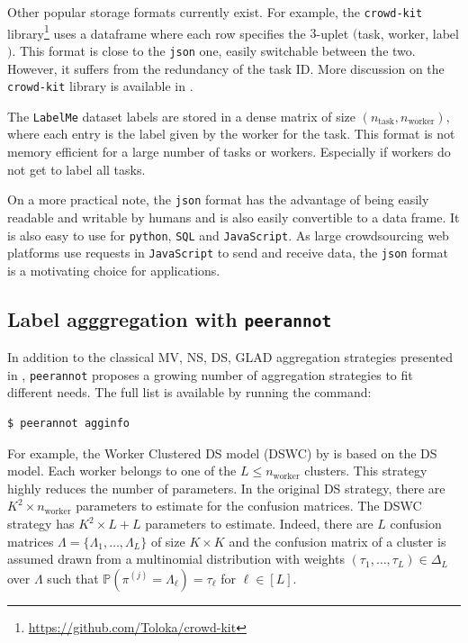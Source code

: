 Other popular storage formats currently exist.
For example, the \texttt{crowd-kit} library\footnote{\url{https://github.com/Toloka/crowd-kit}} uses a dataframe where each row specifies the $3$-uplet $($task, worker, label$)$.
This format is close to the \texttt{json} one, easily switchable between the two. However, it suffers from the redundancy of the task ID.
More discussion on the \texttt{crowd-kit} library is available in .

The \texttt{LabelMe} dataset labels are stored in a dense matrix of size $(n_{\text{task}}, n_{\text{worker}})$, where each entry is the label given by the worker for the task. This format is not memory efficient for a large number of tasks or workers. Especially if workers do not get to label all tasks.

On a more practical note, the \texttt{json} format has the advantage of being easily readable and writable by humans and is also easily convertible to a data frame. It is also easy to use for \texttt{python}, \texttt{SQL} and \texttt{JavaScript}.
As large crowdsourcing web platforms use requests in \texttt{JavaScript} to send and receive data, the \texttt{json} format is a motivating choice for applications.

\subsection{Label agggregation with \texttt{peerannot}}

In addition to the classical MV, NS, DS, GLAD aggregation strategies presented in , \texttt{peerannot} proposes a growing number of aggregation strategies to fit different needs.
The full list is available by running the command:

\begin{verbatim}
$ peerannot agginfo
\end{verbatim}


For example, the Worker Clustered DS model (DSWC) by \citet{imamura2018analysis} is based on the DS model.
Each worker belongs to one of the $L\leq n_{\text{worker}}$ clusters.
This strategy highly reduces the number of parameters.
In the original DS strategy, there are $K^2\times n_{\text{worker}}$ parameters to estimate for the confusion matrices. The DSWC strategy has $K^2\times L + L$ parameters to estimate.
Indeed, there are $L$ confusion matrices $\Lambda=\{\Lambda_1,\dots,\Lambda_L\}$ of size $K\times K$ and the confusion matrix of a cluster is assumed drawn from a multinomial distribution with weights $(\tau_1,\dots,\tau_L)\in\Delta_L$ over $\Lambda$ such that $\mathbb{P}(\pi^{(j)}=\Lambda_\ell)=\tau_\ell$ for $\ell \in [L]$.

